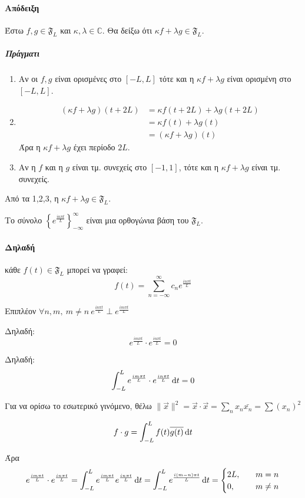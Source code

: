 \documentclass[11pt,a4paper,titlepage,draft]{article}
\begin{document}
\paragraph{Απόδειξη}

Έστω \(f,g \in \mathfrak F_L\) και \(\kappa,\lambda \in \mathbb C\). Θα δείξω ότι \(\kappa f + \lambda g \in \mathfrak F_L\).

\subparagraph{Πράγματι}
\begin{enumerate}
\item
Αν οι \(f,g\) είναι ορισμένες στο \([-L,L]\) τότε και η \(\kappa f + \lambda g\) είναι ορισμένη στο \([-L,L]\).
\item
\begin{align*}
(\kappa f + \lambda g)(t+2L) &= \kappa f (t+2L) + \lambda g (t+2L) \\
&= \kappa f(t) + \lambda g(t) \\
&= (\kappa f + \lambda g)(t)
\end{align*}
Άρα η \(\kappa f + \lambda g\) έχει περίοδο \(2L\).

\item
Αν η \(f\) και η \(g\) είναι τμ. συνεχείς στο \([-1,1]\), τότε και η \(\kappa f+\lambda g\) είναι τμ. συνεχείς.
\end{enumerate}

Από τα 1,2,3, η \(\kappa f + \lambda g \in \mathfrak F_L\).

\begin{theorem*}{}
Το σύνολο \(  \left\lbrace e^{\frac{in\pi t}{L}} \right\rbrace^\infty_{-\infty} \) είναι μια ορθογώνια βάση του \(\mathfrak F_L\).
\tcblower
\paragraph{Δηλαδή}
κάθε \(f(t) \in \mathfrak{F}_L\) μπορεί να γραφεί:
\[
f(t) =
\sum_{n=-\infty}^\infty c_n e^{\frac{in\pi t}{L}}
\]

Επιπλέον \(\forall n,m,\ m \neq n\ e^{\frac{in\pi t}{L}} \perp e^{\frac{im\pi t}{L}}\)

Δηλαδή:
\[
e^{\frac{im\pi t}{L}} \cdot
e^{\frac{in\pi t}{L}} = 0
\]

Δηλαδή:
\[
\int_{-L}^L e^{\frac{im\pi t}{L}} \cdot
 e^{\frac{in\pi t}{L}} \dif t =0
\]

Για να ορίσω το εσωτερικό γινόμενο, θέλω \(
\|\vec{x}\|^2 = \vec{x} \cdot \vec{x} = \sum_n x_n\bar{x_n} = \sum(x_n)^2
\)

\[
f \cdot g = \int_{-L}^L f(t) \overline{g(t)} \dif t
\]

Άρα
\[
e^{\frac{im\pi t}{L}} \cdot
e^{\frac{in\pi t}{L}} =
\int_{-L}^L e^{\frac{im\pi t}{L}} e^{\frac{in\pi t}{L}} \dif t =
\int_{-L}^L e^{\frac{i(m-n)\pi t}{L}} \dif t =
\begin{cases}
2L, \quad & m=n \\
0, \quad & m \neq n
\end{cases}
\]

\end{theorem*}
\end{document}
